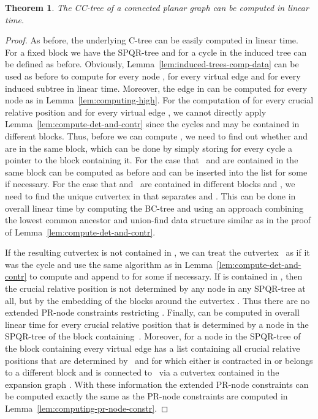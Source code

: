 \documentclass{scrartcl}
\newcommand{\1}[1]{{\normalfont \ensuremath{#1^{\tiny\circled{1}}}}} \newcommand{\2}[1]{{\normalfont \ensuremath{#1^{\tiny\circled{2}}}}} \renewcommand{\k}[1]{{\normalfont \ensuremath{#1^{\tiny\circled{k}}}}} \newcommand{\proj}[2]{\ensuremath{\left.#1\right|_{#2}}} \newcommand{\eps}{\varepsilon}
\theoremstyle{plain} \newtheorem{theorem}{Theorem} \newcounter{lemmacounter} \setcounter{lemmacounter}{0} \newtheorem{lemma}[lemmacounter]{Lemma} \newtheorem{fact}{Fact}  \newtheorem{corollary}{Corollary} \theoremstyle{definition} \newtheorem{definition}{Definition}
\begin{document}
\begin{theorem}
  \label{thm:compute-cc-trees-lin-time}
  The CC-tree  of a connected planar graph  can be
  computed in linear time.
\end{theorem}
\begin{proof}
  As before, the underlying C-tree can be easily computed in linear
  time.  For a fixed block  we have the SPQR-tree  and
  for a cycle  in  the induced tree  can
  be defined as before.  Obviously,
  Lemma~\ref{lem:induced-trees-comp-data} can be used as before to
  compute  for every node ,  for every
  virtual edge and  for every induced
  subtree in linear time.  Moreover, the edge  in
   can be computed for every node  as in
  Lemma~\ref{lem:computing-high}.  For the computation of
   for every crucial relative position 
  and  for every virtual edge , we cannot directly
  apply Lemma~\ref{lem:compute-det-and-contr} since the cycles  and
   may be contained in different blocks.  Thus, before we can
  compute , we need to find out whether  and 
  are in the same block, which can be done by simply storing for every
  cycle a pointer to the block containing it.  For the case that~
  and  are contained in the same block  can be
  computed as before and  can be inserted into the list
   for some  if necessary.  For the case that 
  and~ are contained in different blocks  and , we need to
  find the unique cutvertex  in  that separates  and .
  This can be done in overall linear time by computing the BC-tree and
  using an approach combining the lowest common ancestor and
  union-find data structure similar as in the proof of
  Lemma~\ref{lem:compute-det-and-contr}.  

  If the resulting cutvertex  is not contained in , we can treat
  the cutvertex~ as if it was the cycle  and use the same
  algorithm as in Lemma~\ref{lem:compute-det-and-contr} to compute
   and append  to  for
  some  if necessary.  If  is contained in , then the
  crucial relative position  is not determined by any node
  in any SPQR-tree at all, but by the embedding of the blocks around
  the cutvertex .  Thus there are no extended PR-node constraints
  restricting .  Finally,  can be
  computed in overall linear time for every crucial relative position
   that is determined by a node in the SPQR-tree of the
  block containing~.  Moreover, for a node  in the SPQR-tree
  of the block  containing  every virtual edge  has a list
   containing all crucial relative positions
   that are determined by~ and for which either 
  is contracted in  or belongs to a different block  and is
  connected to~ via a cutvertex contained in the expansion graph
  .  With these information the extended PR-node
  constraints can be computed exactly the same as the PR-node
  constraints are computed in
  Lemma~\ref{lem:computing-pr-node-constr}.


\end{proof}
\end{document}

